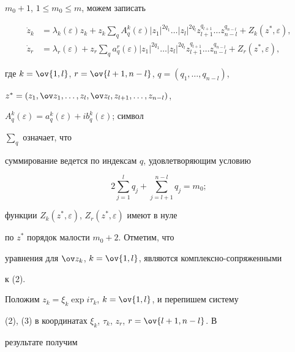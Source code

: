 $m_0+1$, $1\le m_0\le m$, можем записать 


\begin{align} 


\Dot z_k&=\lambda_k(\varepsilon)z_k+z_k\sum_q 


A^k_q(\varepsilon)|z_1|^{2q_1}\dotsc 


|z_l|^{2q_l}z^{q_{l+1}}_{l+1}\dotsc z^{q_{n-l}}_{n-l} 


+Z_k(z^*,\varepsilon), \\ 


% 


\Dot z_r&=\lambda_r(\varepsilon)+z_r\sum_q 


a^r_q(\varepsilon)|z_1|^{2q_1}\dotsc |z_l|^{2q_l} 


z^{q_{l+1}}_{l+1}\dotsc z^{q_{n-l}}_{n-l}+ 


Z_r(z^*,\varepsilon), 


\end{align} 


где $k=\ov{1,l}$, $r=\ov{l+1,n-l}$, $q=(q_1,\dotsc,q_{n-l})$, 


$z^*=(z_1,\ov z_1,\dotsc,z_l,\ov z_l,z_{l+1},\dotsc, z_{n-l})$, 


$A^k_q(\varepsilon)=a^k_q(\varepsilon)+i b^k_q(\varepsilon)$; символ 


$\sum\limits_q$ означает, что 


суммирование ведется по индексам $q$, удовлетворяющим условию 


$$ 


2\sum^l_{j=1}q_j+\sum^{n-l}_{j=l+1}q_j=m_0; 


$$ 


функции $Z_k(z^*,\varepsilon)$, $Z_r(z^*,\varepsilon)$ имеют в нуле 


по $z^*$ порядок малости $m_0+2$. Отметим, что 


уравнения для $\ov z_k$, $k=\ov{1,l}$, являются комплексно-сопряженными 


к (2). 


 


Положим $z_k=\xi_k\exp i\tau_k$, $k=\ov{1,l}$, и перепишем систему 


(2), (3) в координатах $\xi_k$, $\tau_k$, $z_r$, $r=\ov{l+1,n-l}$. В 


результате получим 


